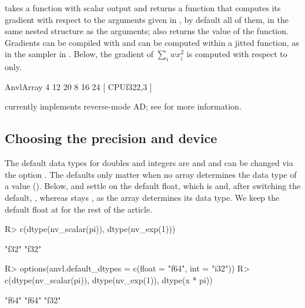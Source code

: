 \documentclass[article,shortnames]{jss}
\renewenvironment{CodeChunk}{\par\addvspace{0.6\baselineskip}\noindent\begin{minipage}{\linewidth}}{\end{minipage}\par\vspace{0.6\baselineskip}}
\begin{document}
 takes a function with scalar output and returns a function that computes its gradient with respect to the arguments given in , by default all of them, in the same nested structure as the arguments;  also returns the value of the function.
Gradients can be compiled with  and can be computed within a jitted function, as in the sampler in .
Below, the gradient of $\sum_{i} w x_i^2$ is computed with respect to  only.

\begin{CodeChunk}
\begin{CodeOutput}
AnvlArray
  4 12 20
  8 16 24
[ CPUf32{2,3} ]
\end{CodeOutput}
\end{CodeChunk}

 currently implements reverse-mode AD; see  for more information.

\subsection{Choosing the precision and device}\label{choosing-precision}

The default data types for  doubles and integers are  and  and can be changed via the option .
The defaults only matter when no array determines the data type of a value ().
Below,  and  settle on the default float, which is  and, after switching the default, , whereas  stays , as the array  determines its data type.
We keep the default float at  for the rest of the article.

\begin{CodeChunk}
\begin{CodeInput}
R> c(dtype(nv_scalar(pi)), dtype(nv_exp(1)))
\end{CodeInput}
\begin{CodeOutput}
[1] "f32" "f32"
\end{CodeOutput}
\begin{CodeInput}
R> options(anvl.default_dtypes = c(float = "f64", int = "i32"))
R> c(dtype(nv_scalar(pi)), dtype(nv_exp(1)), dtype(x * pi))
\end{CodeInput}
\begin{CodeOutput}
[1] "f64" "f64" "f32"
\end{CodeOutput}
\end{CodeChunk}
\end{document}
